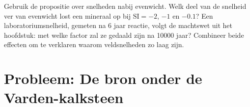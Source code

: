 \begin{exercise}[$\star\star\star$]\label{exo:b3:water-rock-interaction:12}
Gebruik de propositie over snelheden nabij evenwicht. Welk deel van de
snelheid ver van evenwicht lost een mineraal op bij $\mathrm{SI} =
-2$, $-1$ en $-0.1$? Een laboratoriumsnelheid, gemeten na 6 jaar reactie,
volgt de machtswet uit het hoofdstuk: met welke factor zal ze gedaald zijn
na \num{10000} jaar? Combineer beide effecten om te verklaren waarom veldsnelheden
zo laag zijn.
\end{exercise}

\section{Probleem: De bron onder de Varden-kalksteen}

